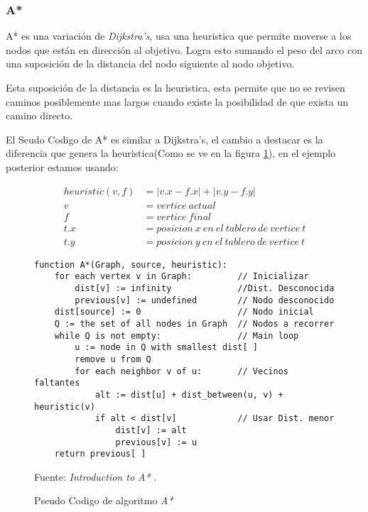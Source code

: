 \subsubsection{A*}

A* es una variación de \textit{Dijkstra's}, usa una heuristica que permite moverse a los nodos que están en dirección al objetivo. Logra esto sumando el peso del arco con una suposición de la distancia del nodo siguiente al nodo objetivo.

Esta suposición de la distancia es la heuristica, esta permite que no se revisen caminos posiblemente mas largos cuando existe la posibilidad de que exista un camino directo. 

El Seudo Codigo de A* es similar a Dijkstra's, el cambio a destacar es la diferencia que genera la heuristica(Como se ve en la figura \ref{fig:ACode}), en el ejemplo posterior estamos usando:

\begin{align*}
	heuristic(v,f) &= |v.x - f.x| + |v.y - f.y| \\
	v &= vertice\  actual \\
	f &= vertice\ final \\
	t.x &= posicion\ x\ en\ el\ tablero\ de\ vertice\ t \\
	t.y &= posicion\ y\ en\ el\ tablero\ de\ vertice\ t 
\end{align*}

	



\begin{figure}
\centering
\begin{lstlisting}[frame=single]
function A*(Graph, source, heuristic):
    for each vertex v in Graph:      	// Inicializar
        dist[v] := infinity             //Dist. Desconocida
        previous[v] := undefined        // Nodo desconocido
    dist[source] := 0 	                // Nodo inicial
    Q := the set of all nodes in Graph 	// Nodos a recorrer
    while Q is not empty:               // Main loop
        u := node in Q with smallest dist[ ]
        remove u from Q
        for each neighbor v of u:       // Vecinos faltantes
            alt := dist[u] + dist_between(u, v) + heuristic(v)
            if alt < dist[v]            // Usar Dist. menor
                dist[v] := alt
                previous[v] := u
    return previous[ ]
\end{lstlisting}
\caption{\label{fig:ACode} Pseudo Codigo de algoritmo \textit{A*}} Fuente: \textit{Introduction to A*} \cite{Red2016June}.
\end{figure}


